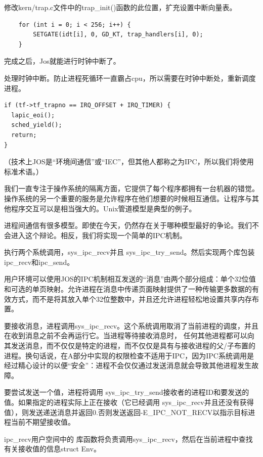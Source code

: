 \begin{ExerciseList}
修改kern/trap.c文件中的trap\_init()函数的此位置，扩充设置中断向量表。

\begin{verbatim}
    for (int i = 0; i < 256; i++) {
        SETGATE(idt[i], 0, GD_KT, trap_handlers[i], 0);
    }
\end{verbatim}

完成之后，Jos就能进行时钟中断了。


处理时钟中断。防止进程死循环一直霸占cpu，所以需要在时钟中断处，重新调度进程。

\begin{verbatim}
if (tf->tf_trapno == IRQ_OFFSET + IRQ_TIMER) {
  lapic_eoi();
  sched_yield();
  return;
}
\end{verbatim}

（技术上JOS是“环境间通信”或“IEC”，但其他人都称之为IPC，所以我们将使用标准术语。）

我们一直专注于操作系统的隔离方面，它提供了每个程序都拥有一台机器的错觉。操作系统的另一个重要的服务是允许程序在他们想要的时候相互通信。让程序与其他程序交互可以是相当强大的。Unix管道模型是典型的例子。

进程间通信有很多模型。即使在今天，仍然存在关于哪种模型最好的争论。我们不会进入这个辩论。相反，我们将实现一个简单的IPC机制。

执行两个系统调用，sys\_ipc\_recv并且 sys\_ipc\_try\_send。然后实现两个库包装 ipc\_recv和ipc\_send。

用户环境可以使用JOS的IPC机制相互发送的“消息”由两个部分组成：单个32位值和可选的单页映射。允许进程在消息中传递页面映射提供了一种传输更多数据的有效方式，而不是将其放入单个32位整数中，并且还允许进程轻松地设置共享内存布置。

要接收消息，进程调用sys\_ipc\_recv。这个系统调用取消了当前进程的调度，并且在收到消息之前不会再运行它。当进程等待接收消息时， 任何其他进程都可以向其发送消息，而不仅仅是特定的进程，而不仅仅是具有与接收进程的父/子布置的进程。换句话说，在A部分中实现的权限检查不适用于IPC，因为IPC系统调用是经过精心设计的以便“安全”：进程不会仅仅通过发送消息就会导致其他进程发生故障。

要尝试发送一个值，进程将调用 sys\_ipc\_try\_send接收者的进程ID和要发送的值。如果指定的进程实际上正在接收（它已经调用 sys\_ipc\_recv并且还没有获得值），则发送递送消息并返回0.否则发送返回-E\_IPC\_NOT\_RECV以指示目标进程当前不期望接收值。

ipc\_recv用户空间中的 库函数将负责调用sys\_ipc\_recv，然后在当前进程中查找有关接收值的信息struct Env。


\end{ExerciseList}
